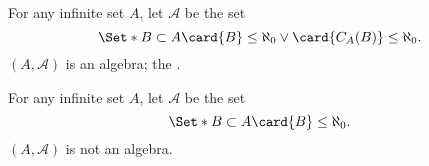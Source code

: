 \begin{expl}
  For any infinite set $A$,
  let $\mathcal{A}$ be the set
  $$
  \Set*{
    B \subset A
  }{
    \card{B} \leq \aleph_0 \lor
    \card{C_{A}(B)} \leq \aleph_0
  }.
  $$
  $(A, \mathcal{A})$ is an algebra;
  the
  .
\end{expl}

\begin{expl}
  For any infinite set $A$,
  let $\mathcal{A}$ be the set
  $$
  \Set*{
    B \subset A
  }{
    \card{B} \leq \aleph_0
  }.
  $$
  $(A, \mathcal{A})$ is not an algebra.
\end{expl}

\strats
